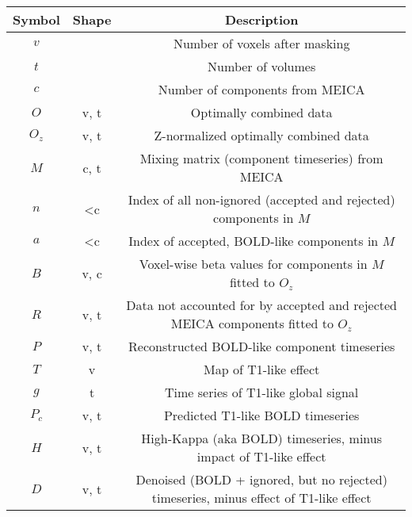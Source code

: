 \documentclass[10pt]{article}
\begin{document}
\begin{center}
\begin{tabular}{ |c|c|c| }
 \hline
 Symbol & Shape & Description \\
 \hline
 $v$ & & Number of voxels after masking \\
 $t$ & & Number of volumes \\
 $c$ & & Number of components from MEICA \\
 $O$ & v, t & Optimally combined data \\
 $O_{z}$ & v, t & Z-normalized optimally combined data \\
 $M$ & c, t & Mixing matrix (component timeseries) from MEICA \\
 $n$ & <c & Index of all non-ignored (accepted and rejected) components in $M$ \\
 $a$ & <c & Index of accepted, BOLD-like components in $M$ \\
 $B$ & v, c & Voxel-wise beta values for components in $M$ fitted to $O_{z}$ \\
 $R$ & v, t & Data not accounted for by accepted and rejected MEICA components fitted to $O_{z}$ \\
 $P$ & v, t & Reconstructed BOLD-like component timeseries \\
 $T$ & v & Map of T1-like effect \\  %
 $g$ & t & Time series of T1-like global signal \\
 $P_{c}$ & v, t & Predicted T1-like BOLD timeseries \\
 $H$ & v, t & High-Kappa (aka BOLD) timeseries, minus impact of T1-like effect \\
 $D$ & v, t & Denoised (BOLD + ignored, but no rejected) timeseries, minus effect of T1-like effect \\
 \hline
\end{tabular}
\end{center}
\end{document}
